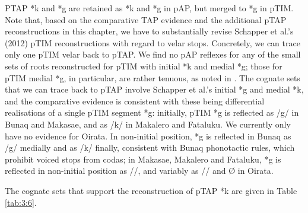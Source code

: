 PTAP *k and *g are retained as *k and *g in pAP, but merged to *g in pTIM. Note that, based on the comparative TAP evidence and the additional pTAP reconstructions in this chapter, we have to substantially revise Schapper et al.'s (2012) pTIM reconstructions with regard to velar stops. Concretely, we can trace only one pTIM velar back to pTAP. We find no pAP reflexes for any of the small sets of roots reconstructed for pTIM with initial *k and medial *g; those for pTIM medial *g, in particular, are rather tenuous, as noted in \citet[212]{SchapperEtAl2012}. The cognate sets that we can trace back to pTAP involve Schapper et al.'s initial *g and medial *k, and the comparative evidence is consistent with these being differential realisations of a single pTIM segment *g: initially, pTIM *g is reflected as /g/ in Bunaq and Makasae, and as /k/ in Makalero and Fataluku. We currently only have no evidence for Oirata. In non-initial position, *g is reflected in Bunaq as /g/ medially and as /k/ finally, consistent with Bunaq phonotactic rules, which prohibit voiced stops from codas; in Makasae, Makalero and Fataluku, *g is reflected in non-initial position as /{\textglotstop}/, and variably as /{\textglotstop}/ and {\O} in Oirata. 

The cognate sets that support the reconstruction of pTAP *k are given in Table \ref{tab:3:6}. 
 

